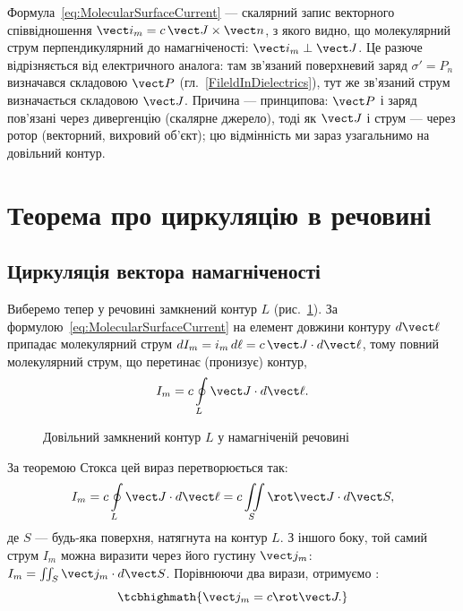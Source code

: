 \begin{Attention}
	Формула~\eqref{eq:MolecularSurfaceCurrent} --- скалярний запис векторного співвідношення $\vect i_m = c\,\vect J\times\vect n$, з якого
	видно, що  молекулярний струм перпендикулярний до намагніченості: $\vect i_m \perp \vect J$. Це разюче
	відрізняється від електричного аналога: там зв'язаний поверхневий заряд $\sigma' = P_n$ визначався  складовою $\vect P$ (гл.~\ref{FileldInDielectrics}), тут же зв'язаний струм визначається  складовою $\vect J$. Причина
	--- принципова: $\vect P$ і заряд пов'язані через дивергенцію (скалярне джерело), тоді як $\vect J$ і струм --- через ротор (векторний,
	вихровий об'єкт); цю відмінність ми зараз узагальнимо на довільний контур.
\end{Attention}

\section{Теорема про циркуляцію в речовині}

\subsection*{Циркуляція вектора намагніченості}

Виберемо тепер у речовині  замкнений контур $L$ (рис.~\ref{pic:Jloop}). За формулою~\eqref{eq:MolecularSurfaceCurrent} на елемент довжини
контуру $d\vect\ell$ припадає молекулярний струм $dI_m = i_m\, d\ell = c\,\vect J\cdot d\vect\ell$, тому повний молекулярний струм, що
перетинає (пронизує) контур,
\begin{equation}\label{eq:CirculationJ}
	I_m = c\oint\limits_L \vect J\cdot d\vect\ell.
\end{equation}

\begin{figure}\centering
	\caption{Довільний замкнений контур $L$ у намагніченій речовині\label{pic:Jloop}}
\end{figure}

За теоремою Стокса цей вираз перетворюється так:
\begin{equation*}
	I_m = c\oint\limits_L \vect J\cdot d\vect\ell = c\iint\limits_S \rot\vect J\cdot d\vect S,
\end{equation*}
де $S$ --- будь-яка поверхня, натягнута на контур $L$. З іншого боку, той самий струм $I_m$ можна виразити через його  густину
$\vect j_m$: $I_m = \iint_S \vect j_m\cdot d\vect S$. Порівнюючи два вирази, отримуємо :
\begin{equation}\label{eq:MolecularCurrentDensity}
	\tcbhighmath{
		\vect j_m = c\rot\vect J.
	}
\end{equation}

